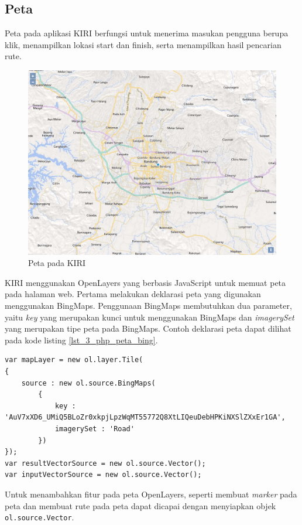 \subsection{Peta}
Peta pada aplikasi KIRI berfungsi untuk menerima masukan pengguna berupa klik,  menampilkan lokasi start dan finish, serta menampilkan hasil pencarian rute.

\begin{figure}[H]
	\centering
	\includegraphics[scale=0.4]{Gambar/KIRI-peta}
	\caption{Peta pada KIRI} 
	\label{fig:3_KIRI_peta}
\end{figure}

KIRI menggunakan OpenLayers yang berbasis JavaScript untuk memuat peta pada halaman web. Pertama melakukan deklarasi peta yang digunakan menggunakan BingMaps. Penggunaan BingMaps membutuhkan dua parameter, yaitu \textit{key} yang merupakan kunci untuk menggunakan BingMaps dan \textit{imagerySet} yang merupakan tipe peta pada BingMaps. Contoh deklarasi peta dapat dilihat pada kode listing \ref{lst_3_php_peta_bing}.

\begin{lstlisting}[caption=Deklarasi peta BingMaps,label = {lst_3_php_peta_bing}]
var mapLayer = new ol.layer.Tile(
{
	source : new ol.source.BingMaps(
		{
			key : 'AuV7xXD6_UMiQ5BLoZr0xkpjLpzWqMT55772Q8XtLIQeuDebHPKiNXSlZXxEr1GA',
			imagerySet : 'Road'
		})
});
var resultVectorSource = new ol.source.Vector();
var inputVectorSource = new ol.source.Vector();
\end{lstlisting}

Untuk menambahkan fitur pada peta OpenLayers, seperti membuat \textit{marker} pada peta dan membuat rute pada peta dapat dicapai dengan menyiapkan objek \verb!ol.source.Vector!.

